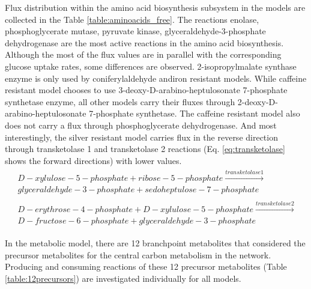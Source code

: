 Flux distribution within the amino acid biosynthesis subsystem in the models are collected in the Table \ref{table:aminoacids_free}. The reactions enolase, phosphoglycerate mutase, pyruvate kinase, glyceraldehyde-3-phosphate dehydrogenase are the most active reactions in the amino acid biosynthesis. Although the most of the flux values are in parallel with the corresponding glucose uptake rates, some differences are observed. 2-isopropylmalate synthase enzyme is only used by coniferylaldehyde andiron resistant models. While caffeine resistant model chooses to use 3-deoxy-D-arabino-heptulosonate 7-phosphate synthetase enzyme, all other models carry their fluxes through 2-deoxy-D-arabino-heptulosonate 7-phosphate synthetase. The caffeine resistant model also does not carry a flux through phosphoglycerate dehydrogenase. And most interestingly, the silver resistant model carries flux in the reverse direction through transketolase 1 and transketolase 2 reactions (Eq. \ref{eq:transketolase} shows the forward directions) with lower values.
\begin{align}
\begin{split}
\label{eq:transketolase}
\ D-xylulose-5-phosphate + ribose-5-phosphate \xrightarrow{transketolase1} \\
\ glyceraldehyde-3-phosphate + sedoheptulose-7-phosphate \\
\ \\
\ D-erythrose-4-phosphate + D-xylulose-5-phosphate \xrightarrow{transketolase2} \\
\ D-fructose-6-phosphate + glyceraldehyde-3-phosphate
\end{split}
\end{align}

\baselineskip


In the metabolic model, there are 12 branchpoint metabolites that considered the precursor metabolites for the central carbon metabolism in the network. Producing and consuming reactions of these 12 precursor metabolites (Table \ref{table:12precursors}) are investigated individually for all models.

